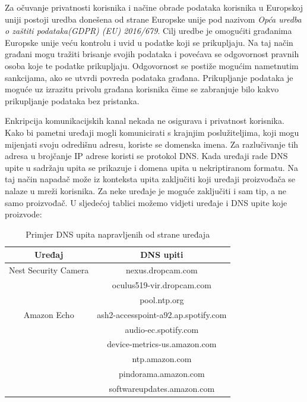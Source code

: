\documentclass[times, utf8, diplomski]{fer}
\begin{document}
Za očuvanje privatnosti korisnika i načine obrade podataka korisnika u Europskoj uniji postoji uredba donešena od strane Europske unije pod nazivom \emph{Opća uredba o zaštiti podataka(GDPR) (EU) 2016/679}\citep{GDPR}. Cilj uredbe je omogućiti građanima Europske unije veću kontrolu i uvid u podatke koji se prikupljaju. Na taj način građani mogu tražiti brisanje svojih podataka i povećava se odgovornost pravnih osoba koje te podatke prikupljaju. Odgovornost se postiže mogućim nametnutim sankcijama, ako se utvrdi povreda podataka građana. Prikupljanje podataka je moguće uz izrazitu privolu građana korisnika čime se zabranjuje bilo kakvo prikupljanje podataka bez pristanka. 

Enkripcija komunikacijskih kanal nekada ne osigurava i privatnost korisnika. Kako bi pametni uređaji mogli komunicirati s krajnjim poslužiteljima, koji mogu mijenjati svoju odredišnu adresu, koriste se domenska imena. Za razlučivanje tih adresa u brojčanje IP adrese koristi se protokol DNS. Kada uređaji rade DNS upite u sadržaju upita se prikazuje i domena upita u nekriptiranom formatu. Na taj način napadač može iz konteksta upita zaključiti koji uređaji proizvođača se nalaze u mreži korisnika. Za neke uređaje je moguće zaključiti i sam tip, a ne samo proizvođač. U sljedećoj tablici možemo vidjeti uređaje i DNS upite koje proizvode:

\begin{table}[h]
    \centering
    \caption{Primjer DNS upita napravljenih od strane uređaja \citep{Apthorpe2017May}}
    \begin{tabular}{| c | c |} 
    \hline
    \textbf{Uređaj} & \textbf{DNS upiti} \\
    \hline\hline
    Nest Security Camera & nexus.dropcam.com \\
     & oculus519-vir.dropcam.com \\
     & pool.ntp.org \\
    \hline
    Amazon Echo & ash2-accesspoint-a92.ap.spotify.com \\ 
     & audio-ec.spotify.com \\ 
     & device-metrics-us.amazon.com \\ 
     & ntp.amazon.com \\ 
     & pindorama.amazon.com \\ 
     & softwareupdates.amazon.com \\
    \hline
    \end{tabular}
    \label{tab:confusion}
\end{table} 
\end{document}
